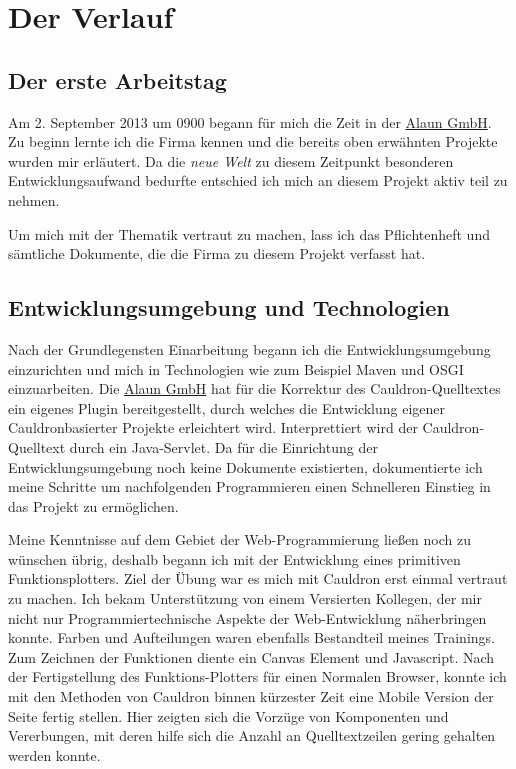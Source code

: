 \documentclass[12pt]{article}
\begin{document}
\section{Der Verlauf}

\subsection{Der erste Arbeitstag}

Am 2. September 2013 um 0900 begann für mich die Zeit in der \href{https://alaun.de/home/}{Alaun GmbH}.
Zu beginn lernte ich die Firma kennen und die bereits oben erwähnten Projekte wurden mir erläutert.
Da die \textit{neue Welt} zu diesem Zeitpunkt besonderen Entwicklungsaufwand bedurfte entschied ich mich
an diesem Projekt aktiv teil zu nehmen.

Um mich mit der Thematik vertraut zu machen, lass ich das Pflichtenheft und sämtliche Dokumente, die die Firma
zu diesem Projekt verfasst hat. 

\subsection{Entwicklungsumgebung und Technologien}

Nach der Grundlegensten Einarbeitung begann ich die Entwicklungsumgebung einzurichten und mich in Technologien
wie zum Beispiel Maven und OSGI einzuarbeiten. Die \href{https://alaun.de/home/}{Alaun GmbH} hat für die Korrektur
des Cauldron-Quelltextes ein eigenes Plugin bereitgestellt, durch welches die Entwicklung eigener Cauldronbasierter
Projekte erleichtert wird. Interprettiert wird der Cauldron-Quelltext durch ein Java-Servlet. 
Da für die Einrichtung der Entwicklungsumgebung noch keine Dokumente existierten, dokumentierte ich meine Schritte
um nachfolgenden Programmieren einen Schnelleren Einstieg in das Projekt zu ermöglichen.

Meine Kenntnisse auf dem Gebiet der Web-Programmierung ließen noch zu wünschen übrig, deshalb begann ich mit der Entwicklung
eines primitiven Funktionsplotters. Ziel der Übung war es mich mit Cauldron erst einmal vertraut zu machen.
Ich bekam Unterstützung von einem Versierten Kollegen, der mir nicht nur Programmiertechnische Aspekte der Web-Entwicklung näherbringen konnte.
Farben und Aufteilungen waren ebenfalls Bestandteil meines Trainings. 
Zum Zeichnen der Funktionen diente ein Canvas Element und Javascript.
Nach der Fertigstellung des Funktions-Plotters für einen Normalen Browser, konnte ich mit den Methoden von Cauldron
binnen kürzester Zeit eine Mobile Version der Seite fertig stellen.
Hier zeigten sich die Vorzüge von Komponenten und Vererbungen, mit deren hilfe sich die Anzahl an Quelltextzeilen gering gehalten
werden konnte.
\end{document}
